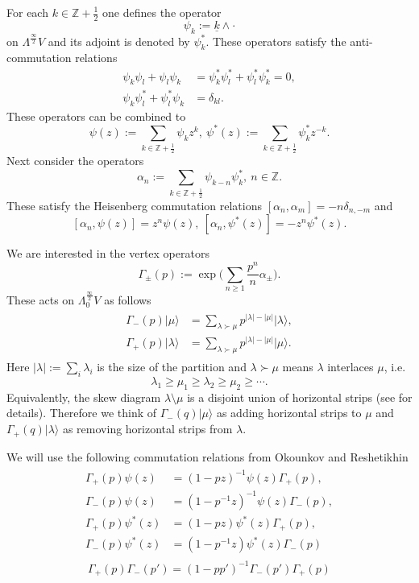 \documentclass{amsart}
\theoremstyle{definition}
\newcommand{\ZZ} {\mathbb{Z}}		%
\begin{document}
For each $k \in \ZZ + \frac{1}{2}$ one defines the operator 
$$
\psi_k := \underline{k} \wedge \cdot
$$
on $\Lambda^{\frac{\infty}{2}} V$ and its adjoint is denoted by $\psi_{k}^{*}$. These operators satisfy the anti-commutation relations
\begin{align*}
\psi_k \psi_l + \psi_l \psi_k &= \psi_{k}^{*} \psi_{l}^{*} + \psi_{l}^{*} \psi_{k}^{*} = 0, \\ 
\psi_k \psi_{l}^{*} + \psi_{l}^{*} \psi_{k} &= \delta_{kl}.  
\end{align*}
These operators can be combined to
$$
\psi(z) := \sum_{k \in \ZZ + \frac{1}{2}} \psi_k z^k, \ \psi^*(z) := \sum_{k \in \ZZ + \frac{1}{2}} \psi_{k}^{*} z^{-k}. 
$$
Next consider the operators 
$$
\alpha_n := \sum_{k \in \ZZ + \frac{1}{2}} \psi_{k-n} \psi_{k}^{*}, \ n \in \ZZ.
$$
These satisfy the Heisenberg commutation relations $[\alpha_n,\alpha_m] = -n \delta_{n,-m}$ and
$$
[\alpha_n, \psi(z)] = z^{n} \psi(z), \ [\alpha_n, \psi^*(z)] =  - z^{n} \psi^*(z). 
$$

We are interested in the vertex operators
$$
\Gamma_{\pm}(p) := \exp \Big( \sum_{n \geq 1} \frac{p^n}{n} \alpha_\pm \Big).
$$
These acts on $\Lambda^{\frac{\infty}{2}}_{0} V$ as follows
\begin{align} \label{add/remove}
\begin{split} 
\Gamma_-(p) |\mu \rangle &= \sum_{\lambda \succ \mu} p^{|\lambda| - |\mu|} |\lambda \rangle, \\ 
\Gamma_+(p) | \lambda \rangle &= \sum_{\lambda \succ \mu} p^{|\lambda| - |\mu|} |\mu \rangle.
\end{split}
\end{align}
Here $|\lambda|:=\sum_i \lambda_i$ is the size of the partition and $\lambda \succ \mu$ means $\lambda$ interlaces $\mu$, i.e.
$$
\lambda_1 \geq \mu_1 \geq \lambda_2 \geq \mu_2 \geq \cdots.
$$
Equivalently, the skew diagram $\lambda \setminus \mu$ is a disjoint union of horizontal strips (see \cite{You} for details). Therefore we think of $\Gamma_-(q) |\mu\rangle$ as adding horizontal strips to $\mu$ and $\Gamma_+(q) |\lambda\rangle$ as removing horizontal strips from $\lambda$. 

We will use the following commutation relations from Okounkov and Reshetikhin \cite{OR2}
\begin{align} \label{gammapsi}
\begin{split}
\Gamma_+(p) \psi(z) &= (1-p z)^{-1} \psi(z) \Gamma_+(p), \\
\Gamma_-(p) \psi(z) &= (1-p^{-1} z)^{-1} \psi(z) \Gamma_-(p), \\
\Gamma_+(p) \psi^*(z) &= (1-p z) \psi^*(z) \Gamma_+(p), \\
\Gamma_-(p) \psi^*(z) &= (1-p^{-1} z) \psi^*(z) \Gamma_-(p)
\end{split}
\end{align}
\begin{align} \label{gammapm}
\Gamma_+(p)\Gamma_-(p') = (1-p p')^{-1} \Gamma_-(p')\Gamma_+(p)
\end{align}
\end{document}
